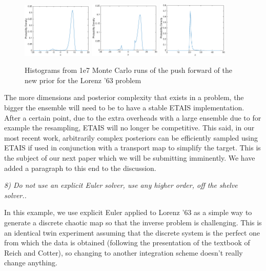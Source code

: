 \documentclass{article}
\newcommand{\comment}[2]{\vspace{0.6cm}{\bf Comment:} {\it #1.}

\vspace{0.3cm}{\bf Answer:} #2}
\begin{document}
{\begin{figure}[htp]
\includegraphics[width=0.3\textwidth]{figures/xhist}
\includegraphics[width=0.3\textwidth]{figures/yhist}
\includegraphics[width=0.3\textwidth]{figures/zhist}
\caption{Histograms from 1e7 Monte Carlo runs of the push forward of the new prior for the Lorenz '63 problem}
\end{figure}

The more dimensions and posterior complexity that exists in a problem, the bigger the ensemble will need to be to have a stable ETAIS implementation. After a certain point, due to the extra overheads with a large ensemble due to for example the resampling, ETAIS will no longer be competitive. This said, in our most recent work, arbitrarily complex posteriors can be efficiently sampled using ETAIS if used in conjunction with a transport map to simplify the target. This is the subject of our next paper which we will be submitting imminently. We have added a paragraph to this end to the discussion.}


  \comment{8) Do not use an explicit Euler solver, use any higher order, off the shelve solver.}{In this example, we use explicit Euler applied to Lorenz '63 as a simple way to generate a discrete chaotic map so that the inverse problem is challenging. This is an identical twin experiment assuming that the discrete system is the perfect one from which the data is obtained (following the presentation of the textbook of Reich and Cotter), so changing to another integration scheme doesn't really change anything.}
\end{document}
